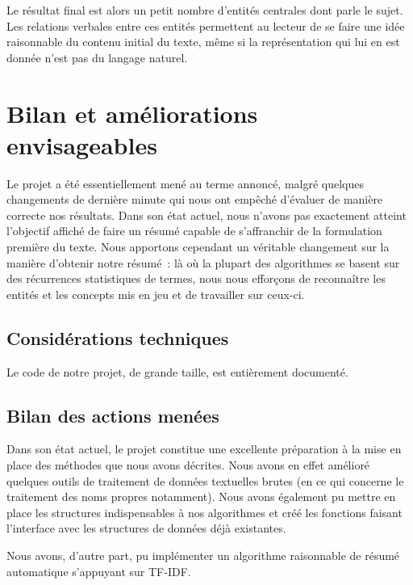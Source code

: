 \documentclass[a4paper, 12pt]{article}
\begin{document}
Le résultat final est alors un petit nombre d'entités centrales dont parle le sujet. Les relations verbales entre ces entités permettent au lecteur de se faire une idée raisonnable du contenu initial du texte, même si la représentation qui lui en est donnée n'est pas du langage naturel.


\section{Bilan et améliorations envisageables}

Le projet a été essentiellement mené au terme annoncé, malgré quelques changements de dernière minute qui nous ont empêché d'évaluer de manière correcte nos résultats. Dans son état actuel, nous n'avons pas exactement atteint l'objectif affiché de faire un résumé capable de s'affranchir de la formulation première du texte. Nous apportons cependant un véritable changement sur la manière d'obtenir notre résumé~: là où la plupart des algorithmes se basent sur des récurrences statistiques de termes, nous nous efforçons de reconnaître les entités et les concepts mis en jeu et de travailler sur ceux-ci.

\subsection{Considérations techniques}

Le code de notre projet, de grande taille, est entièrement documenté.

\subsection{Bilan des actions menées}

Dans son état actuel, le projet constitue une excellente préparation à la mise en place des méthodes que nous avons décrites. Nous avons en effet amélioré quelques outils de traitement de données textuelles brutes (en ce qui concerne le traitement des noms propres notamment). Nous avons également pu mettre en place les structures indispensables à nos algorithmes et créé les fonctions faisant l'interface avec les structures de données déjà existantes.

Nous avons, d'autre part, pu implémenter un algorithme raisonnable de résumé automatique s'appuyant sur TF-IDF. %



\vspace{1\baselineskip}
\end{document}
